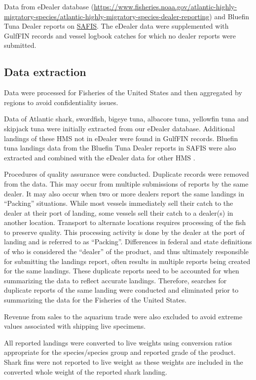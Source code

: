 \documentclass[
]{book}
\begin{document}
Data from eDealer database (\url{https://www.fisheries.noaa.gov/atlantic-highly-migratory-species/atlantic-highly-migratory-species-dealer-reporting}) and Bluefin Tuna Dealer reports on \href{https://www.accsp.org/what-we-do/safis/}{SAFIS}. The eDealer data were supplemented with GulfFIN records and vessel logbook catches for which no dealer reports were submitted.

\hypertarget{data-extraction-16}{%
\subsection{Data extraction}\label{data-extraction-16}}

Data were processed for Fisheries of the United States and then aggregated by regions to avoid confidentiality issues.

Data of Atlantic shark, swordfish, bigeye tuna, albacore tuna, yellowfin tuna and skipjack tuna were initially extracted from our eDealer database. Additional landings of these HMS not in eDealer were found in GulfFIN records. Bluefin tuna landings data from the Bluefin Tuna Dealer reports in SAFIS were also extracted and combined with the eDealer data for other HMS .

Procedures of quality assurance were conducted. Duplicate records were removed from the data. This may occur from multiple submissions of reports by the same dealer. It may also occur when two or more dealers report the same landings in ``Packing'' situations. While most vessels immediately sell their catch to the dealer at their port of landing, some vessels sell their catch to a dealer(s) in another location. Transport to alternate locations requires processing of the fish to preserve quality. This processing activity is done by the dealer at the port of landing and is referred to as ``Packing''. Differences in federal and state definitions of who is considered the ``dealer'' of the product, and thus ultimately responsible for submitting the landings report, often results in multiple reports being created for the same landings. These duplicate reports need to be accounted for when summarizing the data to reflect accurate landings. Therefore, searches for duplicate reports of the same landing were conducted and eliminated prior to summarizing the data for the Fisheries of the United States.

Revenue from sales to the aquarium trade were also excluded to avoid extreme values associated with shipping live specimens.

All reported landings were converted to live weights using conversion ratios appropriate for the species/species group and reported grade of the product. Shark fins were not reported to live weight as these weights are included in the converted whole weight of the reported shark landing.
\end{document}
